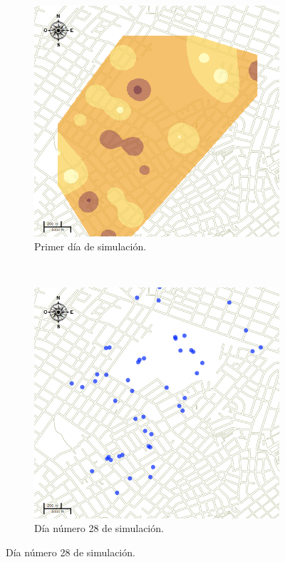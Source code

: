 \begin{figure}[!htbp]
    \centering
    \begin{subfigure}[b]{0.45\textwidth}
            \includegraphics[width=\textwidth]{capitulo-6/graphics/raster/temp-20-0.png}
            \caption{\label{fig:niveles-infestacion-20-a}Primer día de simulación.}
    \end{subfigure}
    ~~
    \begin{subfigure}[b]{0.45\textwidth}
            \includegraphics[width=\textwidth]{capitulo-6/graphics/raster/temp-20-28.png}
            \caption{\label{fig:niveles-infestacion-20-b}Día número 28 de simulación.}
    \end{subfigure}


\end{figure}
